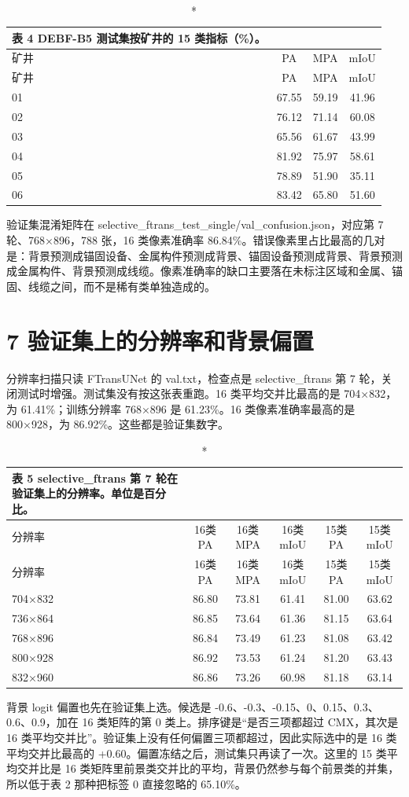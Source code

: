 \documentclass[11pt]{article}
\begin{document}
{\footnotesize\setlength{\tabcolsep}{3pt}
\begin{longtable}{lccc}
\caption*{表 4  DEBF-B5 测试集按矿井的 15 类指标（\%）。}\\
\toprule
矿井 & PA & MPA & mIoU\\
\midrule
\endfirsthead
\toprule
矿井 & PA & MPA & mIoU\\
\midrule
\endhead
01 & 67.55 & 59.19 & 41.96\\
02 & 76.12 & 71.14 & 60.08\\
03 & 65.56 & 61.67 & 43.99\\
04 & 81.92 & 75.97 & 58.61\\
05 & 78.89 & 51.90 & 35.11\\
06 & 83.42 & 65.80 & 51.60\\
\bottomrule
\end{longtable}
}
验证集混淆矩阵在 selective\_ftrans\_test\_single/val\_confusion.json，对应第 7 轮、768×896，788 张，16 类像素准确率 86.84\%。错误像素里占比最高的几对是：背景预测成锚固设备、金属构件预测成背景、锚固设备预测成背景、背景预测成金属构件、背景预测成线缆。像素准确率的缺口主要落在未标注区域和金属、锚固、线缆之间，而不是稀有类单独造成的。

\section*{7  验证集上的分辨率和背景偏置}
分辨率扫描只读 FTransUNet 的 val.txt，检查点是 selective\_ftrans 第 7 轮，关闭测试时增强。测试集没有按这张表重跑。16 类平均交并比最高的是 704×832，为 61.41\%；训练分辨率 768×896 是 61.23\%。16 类像素准确率最高的是 800×928，为 86.92\%。这些都是验证集数字。

{\footnotesize\setlength{\tabcolsep}{3pt}
\begin{longtable}{lccccc}
\caption*{表 5  selective\_ftrans 第 7 轮在验证集上的分辨率。单位是百分比。}\\
\toprule
分辨率 & 16类 PA & 16类 MPA & 16类 mIoU & 15类 PA & 15类 mIoU\\
\midrule
\endfirsthead
\toprule
分辨率 & 16类 PA & 16类 MPA & 16类 mIoU & 15类 PA & 15类 mIoU\\
\midrule
\endhead
704×832 & 86.80 & 73.81 & 61.41 & 81.00 & 63.62\\
736×864 & 86.85 & 73.64 & 61.36 & 81.15 & 63.64\\
768×896 & 86.84 & 73.49 & 61.23 & 81.08 & 63.42\\
800×928 & 86.92 & 73.53 & 61.24 & 81.20 & 63.43\\
832×960 & 86.86 & 73.26 & 60.98 & 81.18 & 63.14\\
\bottomrule
\end{longtable}
}
背景 logit 偏置也先在验证集上选。候选是 -0.6、-0.3、-0.15、0、0.15、0.3、0.6、0.9，加在 16 类矩阵的第 0 类上。排序键是“是否三项都超过 CMX，其次是 16 类平均交并比”。验证集上没有任何偏置三项都超过，因此实际选中的是 16 类平均交并比最高的 +0.60。偏置冻结之后，测试集只再读了一次。这里的 15 类平均交并比是 16 类矩阵里前景类交并比的平均，背景仍然参与每个前景类的并集，所以低于表 2 那种把标签 0 直接忽略的 65.10\%。
\end{document}
